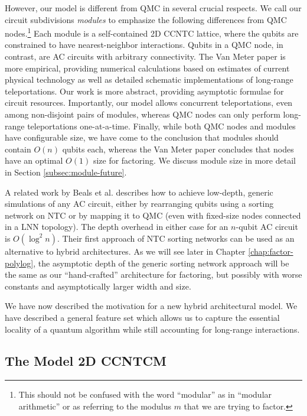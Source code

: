 However, our model is different from \textsf{QMC} in several crucial
respects. We call our circuit subdivisions \emph{modules}
to emphasize the following differences from
\textsf{QMC} nodes.\footnote{This should not be
confused with the word ``modular'' as in ``modular arithmetic'' or as
referring to the modulus $m$ that we are trying to factor.}
Each module is a self-contained \textsf{2D CCNTC} lattice, where the qubits
are constrained to have nearest-neighbor interactions. Qubits in a
\textsf{QMC} node,
in contrast, are \textsf{AC} circuits with arbitrary connectivity. The
Van Meter paper is more empirical, providing numerical calculations
based on estimates of current physical technology as well as detailed
schematic implementations of long-range teleportations. Our work is more
abstract, providing asymptotic formulae for circuit resources. Importantly,
our model allows concurrent teleportations, even among non-disjoint
pairs of modules, whereas \textsf{QMC} nodes can only perform long-range
teleportations one-at-a-time. Finally,
while both \textsf{QMC} nodes and modules have configurable size, we have come to the
conclusion that modules should contain $O(n)$ qubits each, whereas
the Van Meter paper concludes that nodes have an optimal $O(1)$ size for 
factoring.
We discuss module size in more detail in Section \ref{subsec:module-future}.

A related work by Beals et al. \cite{Beals2012} describes how to achieve
low-depth, generic simulations of any \textsf{AC} circuit, either by
rearranging qubits using a sorting network on \textsf{NTC} or
by mapping it to \textsf{QMC}
(even with fixed-size nodes connected in a \textsf{LNN} topology). The
depth overhead in either case for an $n$-qubit \textsf{AC} circuit is $O(\log^2 n)$. Their first approach of \textsf{NTC} sorting networks can be used
as an alternative to hybrid architectures. As we will see later in
Chapter \ref{chap:factor-polylog}, the asymptotic depth of the generic sorting network approach will be the same as our ``hand-crafted'' architecture for factoring,
but possibly with worse constants and asymptotically larger width and size. 

We have now described the motivation for a new hybrid architectural model.
We have described a general feature set which
allows us to capture the essential locality of a quantum algorithm while
still accounting for long-range interactions.

\subsection{The Model \textsf{2D CCNTCM}}
\label{subsec:2dccntcm}

